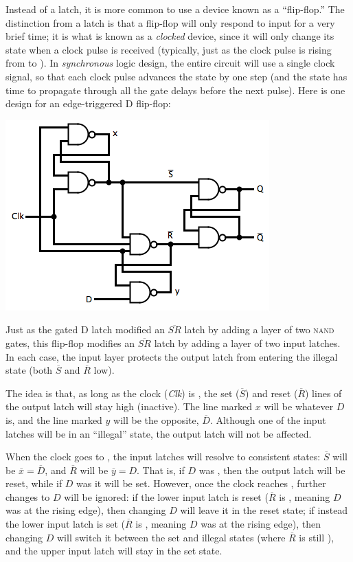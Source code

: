 Instead of a latch, it is more common to use a device known as a ``flip-flop.'' The distinction from a latch is that a flip-flop will only respond to input for a very brief time; it is what is known as a \textit{clocked} device, since it will only change its state when a clock pulse is received (typically, just as the clock pulse is rising from \0 to \1). In \emph{synchronous} logic design, the entire circuit will use a single clock signal, so that each clock pulse advances the state by one step (and the state has time to propagate through all the gate delays before the next pulse). Here is one design for an edge-triggered D flip-flop:
\begin{center}
\includegraphics[width=!,height=!,scale=0.75]{graphics/DFlipFlop.png}
\end{center}
Just as the gated D latch modified an $\overline{SR}$ latch by adding a layer of two \textsc{nand} gates, this flip-flop modifies an $\overline{SR}$ latch by adding a layer of two input latches. In each case, the input layer protects the output latch from entering the illegal state (both $\overline{S}$ and $\overline{R}$ low).

The idea is that, as long as the clock (\textit{Clk}) is \0, the set ($\overline{S}$) and reset ($\overline{R}$) lines of the output latch will stay high (inactive). The line marked $x$ will be whatever $D$ is, and the line marked $y$ will be the opposite, $\overline{D}$. Although one of the input latches will be in an ``illegal'' state, the output latch will not be affected.

When the clock goes to \1, the input latches will resolve to consistent states: $\overline{S}$ will be $\overline{x}=\overline{D}$, and $\overline{R}$ will be $\overline{y}=D$. That is, if $D$ was \0, then the output latch will be reset, while if $D$ was \1 it will be set. However, once the clock reaches \1, further changes to $D$ will be ignored: if the lower input latch is reset ($\overline{R}$ is \0, meaning $D$ was \0 at the rising edge), then changing $D$ will leave it in the reset state; if instead the lower input latch is set ($\overline{R}$ is \1, meaning $D$ was \1 at the rising edge), then changing $D$ will switch it between the set and illegal states (where $\overline{R}$ is still \1), and the upper input latch will stay in the set state.

